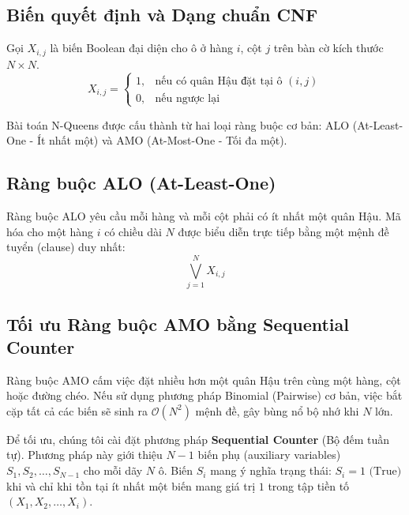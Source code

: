 \documentclass[a4paper,fleqn,numbers]{cas-sc}
\begin{document}
    \subsection{Biến quyết định và Dạng chuẩn CNF}\label{subsec:variables}
    Gọi $X_{i,j}$ là biến Boolean đại diện cho ô ở hàng $i$, cột $j$ trên bàn cờ kích thước $N \times N$.
    \begin{equation}\label{eq:var_def}
        X_{i,j} =
        \begin{cases}
            1, & \text{nếu có quân Hậu đặt tại ô } (i,j) \\
            0, & \text{nếu ngược lại}
        \end{cases}
    \end{equation}

    Bài toán N-Queens được cấu thành từ hai loại ràng buộc cơ bản: ALO (At-Least-One - Ít nhất một) và AMO (At-Most-One
    - Tối đa một).

    \subsection{Ràng buộc ALO (At-Least-One)}\label{subsec:alo}
    Ràng buộc ALO yêu cầu mỗi hàng và mỗi cột phải có ít nhất một quân Hậu.
    Mã hóa cho một hàng $i$ có chiều dài $N$ được biểu diễn trực tiếp bằng một mệnh đề tuyển (clause) duy nhất:
    \begin{equation}\label{eq:alo_row}
        \bigvee_{j=1}^{N} X_{i,j}
    \end{equation}

    \subsection{Tối ưu Ràng buộc AMO bằng Sequential Counter}\label{subsec:amo_seq}
    Ràng buộc AMO cấm việc đặt nhiều hơn một quân Hậu trên cùng một hàng, cột hoặc đường chéo.
    Nếu sử dụng phương pháp Binomial (Pairwise) cơ bản, việc bắt cặp tất cả các biến sẽ sinh ra $\mathcal{O}(N^2)$
    mệnh đề, gây bùng nổ bộ nhớ khi $N$ lớn.

    Để tối ưu, chúng tôi cài đặt phương pháp \textbf{Sequential Counter} (Bộ đếm tuần tự).
    Phương pháp này giới thiệu $N-1$ biến phụ (auxiliary variables) $S_1, S_2, \dots, S_{N-1}$ cho mỗi dãy $N$ ô.
    Biến $S_i$ mang ý nghĩa trạng thái: $S_i = 1 \text{ (True)}$
    khi và chỉ khi tồn tại ít nhất một biến mang giá trị $1$ trong tập tiền tố $(X_1, X_2, \dots, X_i)$.
\end{document}
